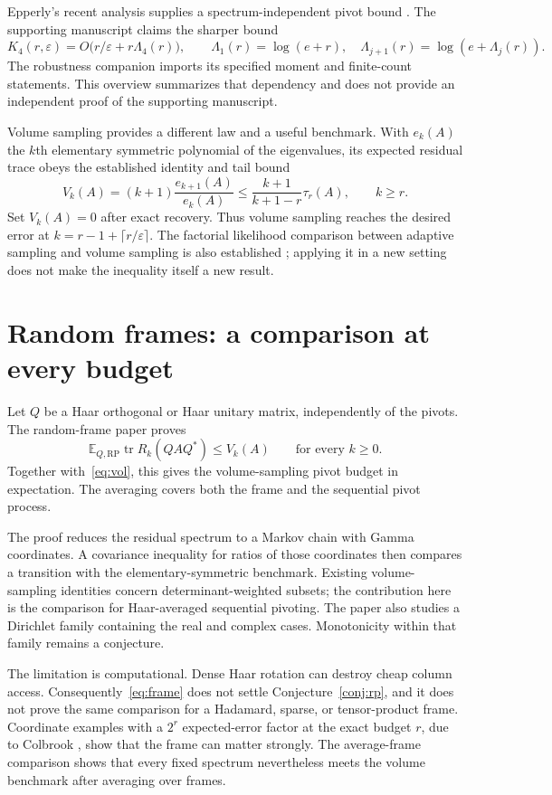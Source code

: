 \documentclass[11pt,a4paper]{article}
\newcommand{\E}{\mathbb E}
\newcommand{\tr}{\operatorname{tr}}
\newcommand{\eps}{\varepsilon}
\begin{document}
Epperly's recent analysis supplies a spectrum-independent pivot bound
\cite{Epperly}. The supporting manuscript \cite{IterLog} claims the sharper
bound
\[
 K_4(r,\eps)=O\bigl(r/\eps+r\Lambda_4(r)\bigr),
 \qquad
 \Lambda_1(r)=\log(e+r),\quad
 \Lambda_{j+1}(r)=\log(e+\Lambda_j(r)).
\]
The robustness companion imports its specified moment and finite-count
statements. This overview summarizes that dependency and does not provide
an independent proof of the supporting manuscript.

Volume sampling provides a different law and a useful benchmark. With
$e_k(A)$ the $k$th elementary symmetric polynomial of the eigenvalues,
its expected residual trace obeys the established identity and tail bound
\cite{DRVW,GS}
\begin{equation}\label{eq:vol}
 V_k(A)=(k+1)\frac{e_{k+1}(A)}{e_k(A)}
 \le\frac{k+1}{k+1-r}\tau_r(A),\qquad k\ge r.
\end{equation}
Set $V_k(A)=0$ after exact recovery. Thus volume sampling reaches the desired
error at $k=r-1+\lceil r/\eps\rceil$. The factorial likelihood comparison
between adaptive sampling and volume sampling is also established
\cite{DV}; applying it in a new setting does not make the inequality itself
a new result.

\section{Random frames: a comparison at every budget}
Let $Q$ be a Haar orthogonal or Haar unitary matrix, independently of the
pivots. The random-frame paper \cite{Frame} proves
\begin{equation}\label{eq:frame}
 \E_{Q,\mathrm{RP}}\tr R_k(QAQ^*)\le V_k(A)
 \qquad\text{for every }k\ge0.
\end{equation}
Together with~\eqref{eq:vol}, this gives the volume-sampling pivot budget in
expectation. The averaging covers both the frame and the sequential pivot
process.

The proof reduces the residual spectrum to a Markov chain with Gamma
coordinates. A covariance inequality for ratios of those coordinates then
compares a transition with the elementary-symmetric benchmark. Existing
volume-sampling identities concern determinant-weighted subsets; the
contribution here is the comparison for Haar-averaged sequential pivoting.
The paper also studies a Dirichlet family containing the real and complex
cases. Monotonicity within that family remains a conjecture.

The limitation is computational. Dense Haar rotation can destroy cheap
column access. Consequently~\eqref{eq:frame} does not settle
Conjecture~\ref{conj:rp}, and it does not prove the same comparison for a
Hadamard, sparse, or tensor-product frame. Coordinate examples with a
$2^r$ expected-error factor at the exact budget $r$, due to Colbrook
\cite{Colbrook}, show that the frame can
matter strongly. The average-frame comparison shows that every fixed
spectrum nevertheless meets the volume benchmark after averaging over
frames.
\end{document}
